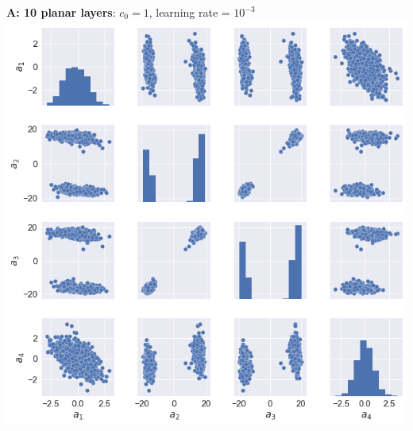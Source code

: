 \documentclass[11pt]{article}
\begin{document}
\clearpage
\begin{center}
\textbf{A: 10 planar layers}: $c_0 = 1$, learning rate = $10^{-3}$ \\
\includegraphics[scale=.45]{images/learnA_samples.png} \\
\end{center}
\clearpage
\end{document}

